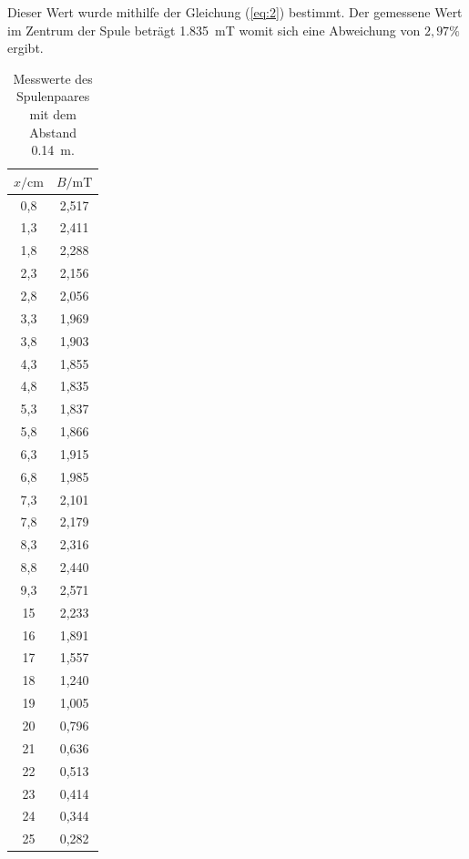 Dieser Wert wurde mithilfe der Gleichung (\ref{eq:2}) bestimmt. Der gemessene Wert
im Zentrum der Spule beträgt \SI{1.835}{\milli\tesla} womit sich eine Abweichung
von $2,97 \%$ ergibt.
\begin{table}[H]
  \centering
  \caption{Messwerte des Spulenpaares mit dem Abstand \SI{0.14}{\meter}.}
  \label{tab:5}
  \begin{tabular}{c c}
    \toprule
    $x/\si{\centi\meter}$ & $B/\si{\milli\tesla}$ \\
    \midrule
    0,8 & 2,517 \\
    1,3 & 2,411 \\
    1,8 & 2,288 \\
    2,3 & 2,156 \\
    2,8 & 2,056 \\
    3,3 & 1,969 \\
    3,8 & 1,903 \\
    4,3 & 1,855 \\
    4,8 & 1,835 \\
    5,3 & 1,837 \\
    5,8 & 1,866 \\
    6,3 & 1,915 \\
    6,8 & 1,985 \\
    7,3 & 2,101 \\
    7,8 & 2,179 \\
    8,3 & 2,316 \\
    8,8 & 2,440 \\
    9,3 & 2,571 \\
    15  & 2,233 \\
    16  & 1,891 \\
    17  & 1,557 \\
    18  & 1,240 \\
    19  & 1,005 \\
    20  & 0,796 \\
    21  & 0,636 \\
    22  & 0,513 \\
    23  & 0,414 \\
    24  & 0,344 \\
    25  & 0,282 \\
    \bottomrule
  \end{tabular}
\end{table}

